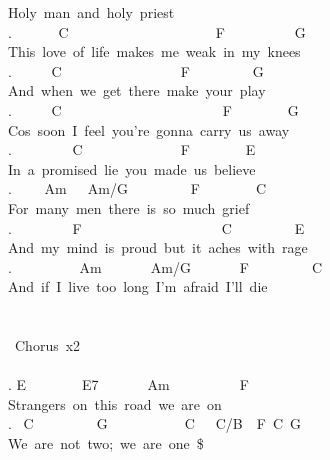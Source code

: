 {Holy\ man\ and\ holy\ priest\\
. \ \ \ \ \ \ C\ \ \ \ \ \ \ \ \ \ \ \ \ \ \ \ \ \ \ \ \ F\ \ \ \ \ \ \ \ \ \ G\\
This\ love\ of\ life\ makes\ me\ weak\ in\ my\ knees\\
. \ \ \ \ \ C\ \ \ \ \ \ \ \ \ \ \ \ \ \ \ \ \ F\ \ \ \ \ \ \ \ \ G\\
And\ when\ we\ get\ there\ make\ your\ play\\
. \ \ \ \ \ C\ \ \ \ \ \ \ \ \ \ \ \ \ \ \ \ \ \ \ \ \ \ \ F\ \ \ \ \ \ \ \ G\\
Cos\ soon\ I\ feel\ you're\ gonna\ carry\ us\ away\\
. \ \ \ \ \ \ \ \ C\ \ \ \ \ \ \ \ \ \ \ \ \ \ F\ \ \ \ \ \ \ \ E\\
In\ a\ promised\ lie\ you\ made\ us\ believe\\
. \ \ \ \ Am\ \ \ Am/G\ \ \ \ \ \ \ \ \ F\ \ \ \ \ \ \ \ C\\
For\ many\ men\ there\ is\ so\ much\ grief\\
. \ \ \ \ \ \ \ \ F\ \ \ \ \ \ \ \ \ \ \ \ \ \ \ \ \ \ \ \ C\ \ \ \ \ \ \ \ \ E\\
And\ my\ mind\ is\ proud\ but\ it\ aches\ with\ rage\\
. \ \ \ \ \ \ \ \ \ Am\ \ \ \ \ \ \ Am/G\ \ \ \ \ \ \ F\ \ \ \ \ \ \ \ \ C\\
And\ if\ I\ live\ too\ long\ I'm\ afraid\ I'll\ die\ \\
\\
\\
\lbrack\ Chorus\rbrack\ x2\\
\\
. E\ \ \ \ \ \ \ \ E7\ \ \ \ \ \ \ Am\ \ \ \ \ \ \ \ \ \ F\\
Strangers\ on\ this\ road\ we\ are\ on\\
. \ C\ \ \ \ \ \ \ \ \ G\ \ \ \ \ \ \ \ \ \ \ C\ \ \ C/B\ \ F\ C\ G\\
We\ are\ not\ two;\ we\ are\ one\ \$}
